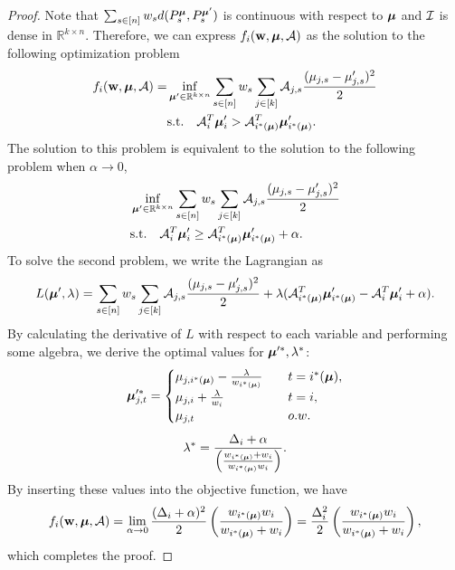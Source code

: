 \begin{proof}
           Note that $\sum_{s \in [n]} w_s d(P^{\boldsymbol{\mu}}_{s}, P^{\boldsymbol{\mu}'}_{s})$ is continuous with respect to $\boldsymbol{\mu}$ and $\mathcal{I}$ is dense in $\mathbb{R}^{k \times n}$. Therefore, we can express $f_i(\mathbf{w}, \boldsymbol{\mu}, \mathcal{A})$ as the solution to the following optimization problem
            \begin{align*}
                f_i(\mathbf{w}, \boldsymbol{\mu}, \mathcal{A}) = &\inf_{{\boldsymbol{\mu}' \in \mathbb{R}^{k \times n}}} \sum_{s \in [n]} w_s \sum_{j \in [k]} \mathcal{A}_{j,s}  \frac{(\mu_{j,s} - \mu'_{j,s})^2}{2} \\
                & \text{s.t.} \quad \mathcal{A}_i^T \boldsymbol{\mu}'_i > \mathcal{A}_{i^*(\boldsymbol{\mu})}^T \boldsymbol{\mu}'_{i^*(\boldsymbol{\mu})}.
            \end{align*}
            The solution to this problem is equivalent to the solution to the following problem when $\alpha \rightarrow 0$,
            \begin{align*}
                &\inf_{\boldsymbol{\mu}' \in \mathbb{R}^{k \times n}} \sum_{s \in [n]} w_s \sum_{j \in [k]} \mathcal{A}_{j,s}  \frac{(\mu_{j,s} - \mu'_{j,s})^2}{2} \\
                & \text{s.t.} \quad \mathcal{A}_i^T \boldsymbol{\mu}'_i \geq \mathcal{A}_{i^*(\boldsymbol{\mu})}^T \boldsymbol{\mu}'_{i^*(\boldsymbol{\mu})} + \alpha.
            \end{align*}
            To solve the second problem, we write the Lagrangian as 
            \begin{align*}
                L(\boldsymbol{\mu}', \lambda) = \sum_{s \in [n]} w_s \sum_{j \in [k]} \mathcal{A}_{j,s}  \frac{(\mu_{j,s} - \mu'_{j,s})^2}{2} + \lambda(\mathcal{A}_{i^*(\boldsymbol{\mu})}^T \boldsymbol{\mu}'_{i^*(\boldsymbol{\mu})} - \mathcal{A}_i^T \boldsymbol{\mu}'_i + \alpha).
            \end{align*}
            By calculating the derivative of $L$ with respect to each variable and performing some algebra, we derive the optimal values for $\boldsymbol{\mu}'^*, \lambda^*$: 
            \begin{align*}
                \boldsymbol{\mu}'^*_{j,t} = 
                \begin{cases}
                    \mu_{j, i^*(\boldsymbol{\mu})} - \frac{\lambda}{w_{i^*(\boldsymbol{\mu})}} \quad &t = i^*(\boldsymbol{\mu}), \\ 
                    \mu_{j,i} + \frac{\lambda}{w_i} \quad & t=i, \\
                    \mu_{j,t} \quad & o.w.
                \end{cases}
            \end{align*}
            \begin{align*}
                \lambda^* = \frac{\Delta_i + \alpha}{\left( \frac{w_{i^*(\boldsymbol{\mu})} + w_i}{w_{i^*(\boldsymbol{\mu})} w_i}\right)}. 
            \end{align*}
            By inserting these values into the objective function, we have
            \begin{align*}
                f_i(\mathbf{w}, \boldsymbol{\mu}, \mathcal{A}) = \lim_{\alpha \rightarrow 0} \frac{(\Delta_i + \alpha)^2}{2} \left( \frac{w_{i^*(\boldsymbol{\mu})} w_i}{w_{i^*(\boldsymbol{\mu})} + w_i} \right) = \frac{\Delta_i^2}{2} \left( \frac{w_{i^*(\boldsymbol{\mu})} w_i}{w_{i^*(\boldsymbol{\mu})} + w_i} \right),
            \end{align*}
            which completes the proof.
        \end{proof}
    
